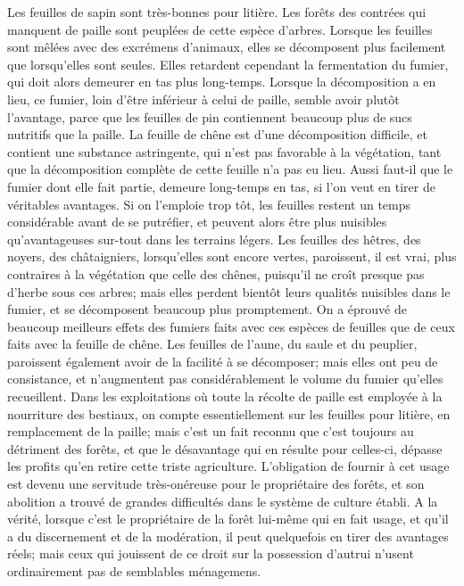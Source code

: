 Les feuilles de sapin sont très-bonnes pour litière. Les forêts des contrées qui manquent de paille sont peuplées de cette espèce d'arbres. Lorsque les feuilles sont mêlées avec des excrémens d'animaux, elles se décomposent plus facilement que lorsqu'elles sont seules. Elles retardent cependant la fermentation du fumier, qui doit alors demeurer en tas plus long-temps. Lorsque la décomposition a en lieu, ce fumier, loin d'être inférieur à celui de paille, semble avoir plutôt l'avantage, parce que les feuilles de pin contiennent beaucoup plus de sucs nutritifs que la paille.
La feuille de chêne est d'une décomposition difficile, et contient une substance astringente, qui n'est pas favorable à la végétation, tant que la décomposition complète de cette feuille n'a pas eu lieu. Aussi faut-il que le fumier dont elle fait partie, demeure long-temps en tas, si l'on veut en tirer de véritables avantages. Si on l'emploie trop tôt, les feuilles restent un temps considérable avant de se putréfier, et peuvent\setcounter{page}{62} alors être plus nuisibles qu'avantageuses sur-tout dans les terrains légers.
Les feuilles des hêtres, des noyers, des châtaigniers, lorsqu'elles sont encore vertes, paroissent, il est vrai, plus contraires à la végétation que celle des chênes, puisqu'il ne croît presque pas d'herbe sous ces arbres; mais elles perdent bientôt leurs qualités nuisibles dans le fumier, et se décomposent beaucoup plus promptement. On a éprouvé de beaucoup meilleurs effets des fumiers faits avec ces espèces de feuilles que de ceux faits avec la feuille de chêne.
Les feuilles de l'aune, du saule et du peuplier, paroissent également avoir de la facilité à se décomposer; mais elles ont peu de consistance, et n'augmentent pas considérablement le volume du fumier qu'elles recueillent.
Dans les exploitations où toute la récolte de paille est employée à la nourriture des bestiaux, on compte essentiellement sur les feuilles pour litière, en remplacement de la paille; mais c'est un fait reconnu que c'est toujours au détriment des forêts, et que le désavantage qui en résulte pour celles-ci, dépasse les profits qu'en retire cette triste agriculture. L'obligation de fournir à cet usage\setcounter{page}{63} est devenu une servitude très-onéreuse pour le propriétaire des forêts, et son abolition a trouvé de grandes difficultés dans le système de culture établi. A la vérité, lorsque c'est le propriétaire de la forêt lui-même qui en fait usage, et qu'il a du discernement et de la modération, il peut quelquefois en tirer des avantages réels; mais ceux qui jouissent de ce droit sur la possession d'autrui n'usent ordinairement pas de semblables ménagemens.
